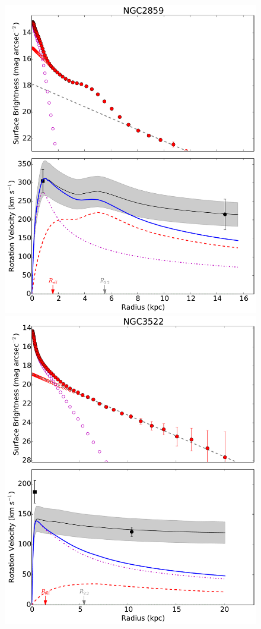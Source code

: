 \documentclass[apjl, twocolappendix]{emulateapj}
\begin{document}
\begin{figure}
\begin{minipage}{0.32\textwidth}
\centering
\includegraphics[width=\textwidth]{NGC2859_MassModel.pdf}
\end{minipage}
\begin{minipage}{0.32\textwidth}
\centering
\includegraphics[width=\textwidth]{NGC3522_MassModel.pdf}

\end{minipage}
\end{figure}
\end{document}
